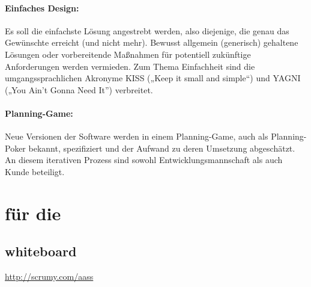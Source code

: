 \documentclass[fontsize=9pt,paper=a4,parskip=half,DIV=11,twocolumn]{scrartcl}
\begin{document}

\paragraph{Einfaches Design:} Es soll die einfachste Lösung angestrebt werden,
also diejenige, die genau das Gewünschte erreicht (und nicht mehr). Bewusst allgemein
(generisch) gehaltene Lösungen oder vorbereitende Maßnahmen für potentiell
zukünftige Anforderungen werden vermieden. Zum Thema Einfachheit sind die
umgangssprachlichen Akronyme KISS („Keep it small and simple“) und YAGNI („You
Ain’t Gonna Need It”) verbreitet.

\paragraph{Planning-Game:} Neue Versionen der Software werden in einem
Planning-Game, auch als Planning-Poker bekannt, spezifiziert und der Aufwand zu deren Umsetzung
abgeschätzt. An diesem iterativen Prozess sind sowohl Entwicklungsmannschaft als
auch Kunde beteiligt.





\section{\ADCD{} für die \AASS}


\subsection{whiteboard}

\url{http://scrumy.com/aass}
\end{document}

